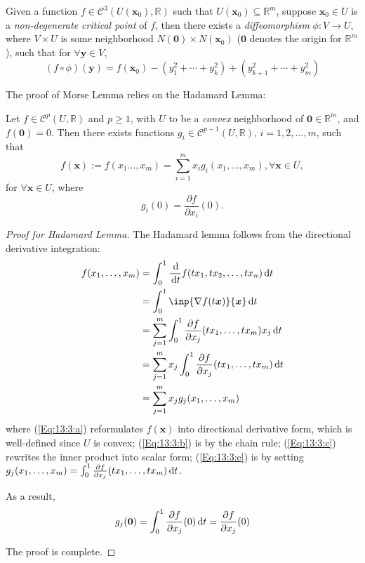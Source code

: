 \begin{theorem}
Given a function $f\in\mathcal{C}^3(U(\bm x_0),\mathbb{R})$ such that $U(\bm x_0)\subseteq \mathbb{R}^m$, suppose $\bm x_0\in U$ is a \emph{non-degenerate critical point} of $f$, then there exists a \emph{diffeomorphism} $\phi:V\to U$, where $V\times U$ is some neighborhood $N(\bm 0)\times N(\bm x_0)$ ($\bm0$ denotes the origin for $\mathbb{R}^m$), such that for $\forall \bm y\in V$,
\[
(f\circ \phi)(\bm y)=f(\bm x_0)-(y_1^2+\cdots+y_k^2)+(y_{k+1}^2+\cdots+y_m^2)
\]
\end{theorem}

The proof of Morse Lemma relies on the Hadamard Lemma:

\begin{proposition}
Let $f\in\mathcal{C}^p(U,\mathbb{R})$ and $p\ge1$, with $U$ to be a \emph{convex} neighborhood of $\bm0\in\mathbb{R}^m$, and $f(\bm0)=0$. Then there exists functions $g_i\in\mathcal{C}^{p-1}(U,\mathbb{R})$, $i=1,2,\dots,m$, such that
\begin{equation}\label{Eq:13:1}
f(\bm x):=f(x_1\dots,x_m)=\sum_{i=1}^mx_ig_i(x_1,\dots,x_m),\forall \bm x\in U,
\end{equation}
for $\forall\bm x\in U$, where 
\begin{equation*}
g_i(0)=\frac{\partial f}{\partial x_i}(0).
\end{equation*}
\end{proposition}

\begin{proof}[Proof for Hadamard Lemma]

The Hadamard lemma follows from the directional derivative integration:
\begin{subequations}
\begin{align}
f(x_1,\dots,x_m)&=\int_0^1\frac{\diff}{\diff t}f(tx_1,tx_2,\dots,tx_n)\diff t\label{Eq:13:3:a}\\
&=\int_0^1
\inp{\nabla f(t\bm x)}{\bm x}
\diff t\label{Eq:13:3:b}\\
&=
\sum_{j=1}^m
\int_0^1\frac{\partial f}{\partial x_j}(tx_1,\dots,tx_m)x_j\diff t\label{Eq:13:3:c}\\
&=\sum_{j=1}^mx_j\int_0^1\frac{\partial f}{\partial x_j}(tx_1,\dots,tx_m)\diff t\label{Eq:13:3:d}\\
&=\sum_{j=1}^mx_jg_j(x_1,\dots,x_m)\label{Eq:13:3:e}
\end{align}
\end{subequations}
where (\ref{Eq:13:3:a}) reformulates $f(\bm x)$ into directional derivative form, which is well-defined since $U$ is convex; (\ref{Eq:13:3:b}) is by the chain rule; (\ref{Eq:13:3:c}) rewrites the inner product into scalar form; (\ref{Eq:13:3:e}) is by setting $g_j(x_1,\dots,x_m)=\int_0^1\frac{\partial f}{\partial x_j}(tx_1,\dots,tx_m)\,\mathrm{d} t$.

As a result,
\[
g_j(\bm0)=\int_0^1\frac{\partial f}{\partial x_j}(0)\,\mathrm{d} t=\frac{\partial f}{\partial x_j}(0)
\]

The proof is complete.
\end{proof}

